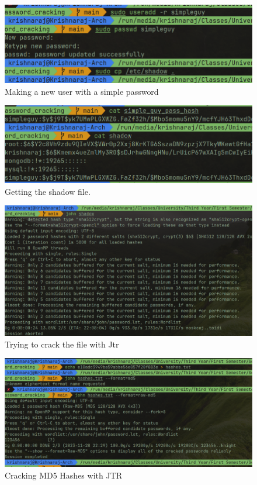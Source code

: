 \documentclass[11pt]{article}
\begin{document}
\begin{figure}[H]
    \centering
    \includegraphics[width=.95\textwidth]{new user.png}
    \caption{Making a new user with a simple password}
\end{figure}

\begin{figure}[H]
    \centering
    \includegraphics[width=.95\textwidth]{shadow.png}
    \caption{Getting the shadow file. }
\end{figure}

\begin{figure}[H]
    \centering
    \includegraphics[width=.95\textwidth]{john shadow.png}
    \caption{Trying to crack the file with Jtr}
\end{figure}

\begin{figure}[H]
    \centering
    \includegraphics[width=.95\textwidth]{md5hashcrack.png}
    \caption{Cracking MD5 Hashes with JTR}
\end{figure}
\end{document}
